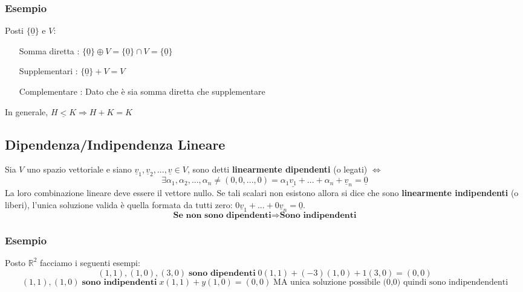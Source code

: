 \subsubsection{Esempio}
Posti $\{ \underline{0} \}$ e $V$:
\begin{itemize}
\item[Somma diretta]: $ \{ \underline{0} \} \oplus V = \{ \underline{0} \} \cap V = \{ \underline{0} \}$
\item[Supplementari]: $  \{ \underline{0} \} + V = V$
\item[Complementare]: Dato che è sia somma diretta che supplementare
\end{itemize}
In generale, $ H \underline{<} K \Rightarrow H + K = K $

\subsection{Dipendenza/Indipendenza Lineare}
Sia $V$ uno spazio vettoriale e siano $\underline{v}_1, \underline{v}_2, ..., \underline{v} \in V$, sono detti \textbf{linearmente dipendenti} (o legati) $\Leftrightarrow$
$$ \exists \alpha_1, \alpha_2, ..., \alpha_n \neq (0,0,...,0) = \alpha_1\underline{v_1} + ... + \alpha_n+\underline{v}_n = \underline{0}$$
La loro combinazione lineare deve essere il vettore nullo.
Se tali scalari non esistono allora si dice che sono \textbf{linearmente indipendenti} (o liberi), l'unica soluzione valida è quella formata da tutti zero: $0\underline{v}_1+...+0\underline{v}_n = \underline{0}$.
$$ \textbf{Se non sono dipendenti} \Rightarrow \textbf{Sono indipendenti}$$

\subsubsection{Esempio}
Posto $ \mathbb{R}^2 $ facciamo i seguenti esempi:
$$ (1,1),(1,0),(3,0) \; \textbf{sono dipendenti} \; 0(1,1)+(-3)(1,0)+1(3,0) = (0,0) $$
$$ (1,1),(1,0) \; \textbf{sono indipendenti} \; x(1,1) + y(1,0) = (0,0) \; \text{MA unica soluzione possibile (0,0) quindi sono indipendendenti} $$


